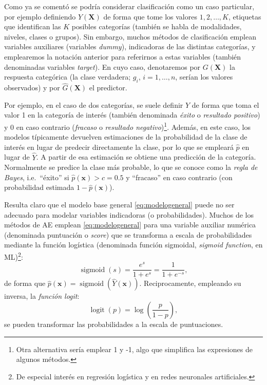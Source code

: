 \documentclass[
]{book}
\theoremstyle{break}
\theoremstyle{nonumberplain}
\begin{document}
Como ya se comentó se podría considerar clasificación como un caso particular, por ejemplo definiendo \(Y\left(\mathbf{X} \right)\) de forma que tome los valores \(1, 2, \ldots, K\), etiquetas que identifican las \(K\) posibles categorías (también se habla de modalidades, niveles, clases o grupos).
Sin embargo, muchos métodos de clasificación emplean variables auxiliares (variables \emph{dummy}), indicadoras de las distintas categorías, y emplearemos la notación anterior para referirnos a estas variables (también denominadas variables \emph{target}).
En cuyo caso, denotaremos por \(G \left(\mathbf{X} \right)\) la respuesta categórica (la clase verdadera; \(g_i\), \(i =1, \ldots, n\), serían los valores observados) y por \(\hat G \left(\mathbf{X} \right)\) el predictor.

Por ejemplo, en el caso de dos categorías, se suele definir \(Y\) de forma que toma el valor 1 en la categoría de interés (también denominada \emph{éxito} o \emph{resultado positivo}) y 0 en caso contrario (\emph{fracaso} o \emph{resultado negativo})\footnote{Otra alternativa sería emplear 1 y -1, algo que simplifica las expresiones de algunos métodos.}.
Además, en este caso, los modelos típicamente devuelven estimaciones de la probabilidad de la clase de interés en lugar de predecir directamente la clase, por lo que se empleará \(\hat p\) en lugar de \(\hat Y\).
A partir de esa estimación se obtiene una predicción de la categoría.
Normalmente se predice la clase más probable, lo que se conoce como la \emph{regla de Bayes}, i.e.~``éxito'' si \(\hat p(\mathbf{x}) > c = 0.5\) y ``fracaso'' en caso contrario (con probabilidad estimada \(1 - \hat p(\mathbf{x})\)).

Resulta claro que el modelo base general \eqref{eq:modelogeneral} puede no ser adecuado para modelar variables indicadoras (o probabilidades).
Muchos de los métodos de AE emplean \eqref{eq:modelogeneral} para una variable auxiliar numérica (denominada puntuación o \emph{score}) que se transforma a escala de probabilidades mediante la función logística (denominada función sigmoidal, \emph{sigmoid function}, en ML)\footnote{De especial interés en regresión logística y en redes neuronales artificiales.}: \[\operatorname{sigmoid}(s) = \frac{e^s}{1 + e^s}= \frac{1}{1 + e^{-s}},\] de forma que \(\hat p(\mathbf{x}) = \operatorname{sigmoid}(\hat Y(\mathbf{x}))\).
Reciprocamente, empleando su inversa, la \emph{función logit}: \[\operatorname{logit}(p)=\log\left( \frac{p}{1-p} \right),\] se pueden transformar las probabilidades a la escala de puntuaciones.
\end{document}

